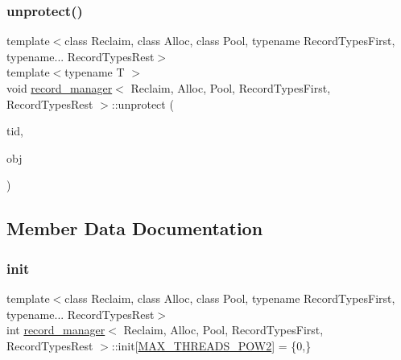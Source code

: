 \mbox{\label{classrecord__manager_af60b539a2100efc85a22a605cf7c0ad9}} 
\subsubsection{\texorpdfstring{unprotect()}{unprotect()}}
{\footnotesize\ttfamily template$<$class Reclaim, class Alloc, class Pool, typename Record\+Types\+First, typename... Record\+Types\+Rest$>$ \\
template$<$typename T $>$ \\
void \hyperlink{classrecord__manager}{record\+\_\+manager}$<$ Reclaim, Alloc, Pool, Record\+Types\+First, Record\+Types\+Rest $>$\+::unprotect (\begin{DoxyParamCaption}\item[{const int}]{tid,  }\item[{T $\ast$const}]{obj }\end{DoxyParamCaption})\hspace{0.3cm}{\ttfamily [inline]}}



\subsection{Member Data Documentation}
\mbox{\label{classrecord__manager_a50fe8392a791e6f3b296a2e25b337149}} 
\subsubsection{\texorpdfstring{init}{init}}
{\footnotesize\ttfamily template$<$class Reclaim, class Alloc, class Pool, typename Record\+Types\+First, typename... Record\+Types\+Rest$>$ \\
int \hyperlink{classrecord__manager}{record\+\_\+manager}$<$ Reclaim, Alloc, Pool, Record\+Types\+First, Record\+Types\+Rest $>$\+::init\mbox{[}\hyperlink{plaf_8h_ac1585a3455dd3e33e877e588be9e466b}{M\+A\+X\+\_\+\+T\+H\+R\+E\+A\+D\+S\+\_\+\+P\+O\+W2}\mbox{]} = \{0,\}\hspace{0.3cm}{\ttfamily [protected]}}

\mbox{\label{classrecord__manager_a142bc059fc2b171665a9aed59873de9a}} 
